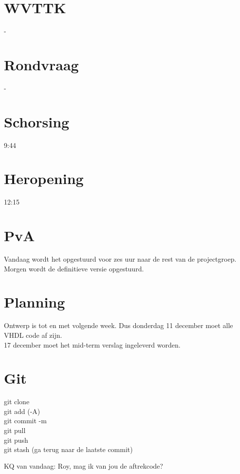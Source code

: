 \documentclass[11pt,twoside,a4paper]{article}
\begin{document}
\section{WVTTK}
-

\section{Rondvraag}
-

\section{Schorsing}
9:44

\section{Heropening}
12:15

\section{PvA}
Vandaag wordt het opgestuurd voor zes uur naar de rest van de projectgroep. Morgen wordt de definitieve versie opgestuurd.

\section{Planning}
Ontwerp is tot en met volgende week. Dus donderdag 11 december moet alle VHDL code af zijn.\\
17 december moet het mid-term verslag ingeleverd worden.

\section{Git}
git clone\\
git add (-A)\\
git commit -m\\
git pull\\
git push\\
git stash (ga terug naar de laatste commit)


\vfill
KQ van vandaag: Roy, mag ik van jou de aftrekcode?
\end{document}
